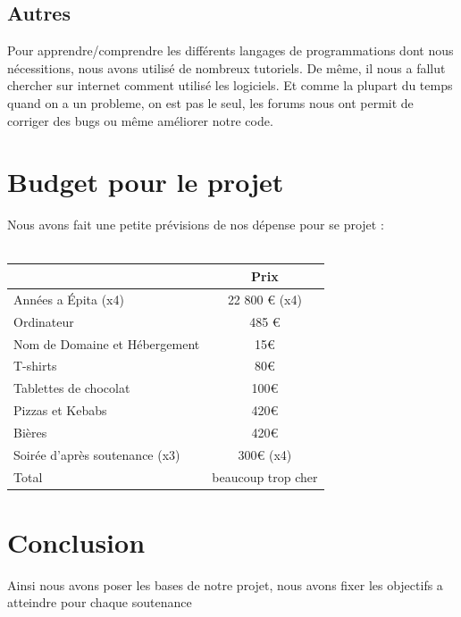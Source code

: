 \documentclass [11pt]{report}
\begin{document}
	\section {Autres}

	Pour apprendre/comprendre les différents langages de programmations dont nous nécessitions, nous avons utilisé de nombreux tutoriels. De même, il nous a fallut chercher sur internet comment utilisé les logiciels. Et comme la plupart du temps quand on a un probleme, on est pas le seul, les forums nous ont permit de corriger des bugs ou même améliorer notre code.


\chapter {Budget pour le projet}
	Nous avons fait une petite prévisions de nos dépense pour se projet :\\\\

				\begin{tabular}{|l|c|}
				\hline
		 		 & Prix \\
				\hline
				Années a \'Epita (x4) & 22 800 € (x4)\\
				\hline
				Ordinateur & 485 €  \\
				\hline
				Nom de Domaine et Hébergement &  15€ \\
				\hline
				T-shirts & 80€ \\
				\hline
				Tablettes de chocolat & 100€ \\
				\hline
				Pizzas et Kebabs & 420€  \\
				\hline
				Bières  & 420€   \\
	          			 \hline
				Soirée d'après soutenance (x3) & 300€ (x4)\\
				\hline 
				Total & beaucoup trop cher \\
				\hline
				
			\end{tabular}
\chapter {Conclusion}
	Ainsi nous avons poser les bases de notre projet, nous avons fixer les objectifs a atteindre pour chaque soutenance
\end{document}
